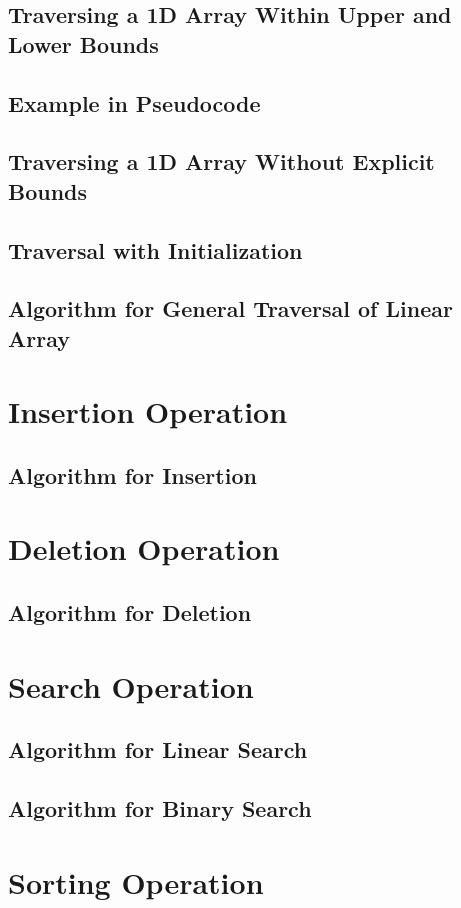 \documentclass[12pt, oneside]{book}
\begin{document}
\subsection{Traversing a 1D Array Within Upper and Lower Bounds}
\subsection{ Example in Pseudocode}
\subsection{Traversing a 1D Array Without Explicit Bounds}
\subsection{Traversal with Initialization}
\subsection{Algorithm for General Traversal of Linear Array}
\section{Insertion Operation}
\subsection*{Algorithm for Insertion}
\section{Deletion Operation}
\subsection*{Algorithm for Deletion}
\section{Search Operation}
\subsection*{Algorithm for Linear Search}
\subsection*{Algorithm for Binary Search}
\section{Sorting Operation}
\end{document}
